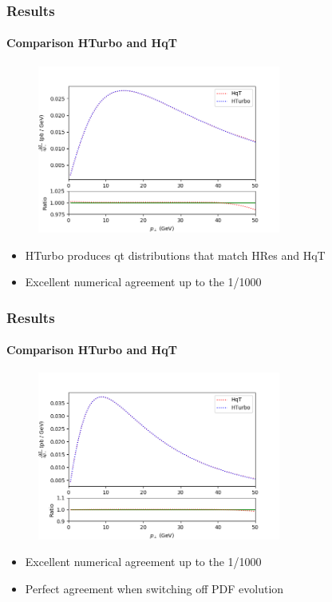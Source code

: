 \documentclass[aspectratio=43]{beamer}
\begin{document}
\begin{frame}
	
	\frametitle{Results}
	\framesubtitle{Comparison HTurbo and HqT}
	
	\begin{figure}
		\includegraphics[width = 8cm]{plots/hturbo_LL.png}
	\end{figure}
	
	\begin{itemize}
		\item HTurbo produces qt distributions that match HRes and HqT
		\item Excellent numerical agreement up to the 1/1000
	\end{itemize}

\end{frame}

\begin{frame}

	\frametitle{Results}
	\framesubtitle{Comparison HTurbo and HqT}
	
	\begin{figure}
		\includegraphics[width = 8cm]{plots/hturbo_NLL_noevol.png}
	\end{figure}
	
	\begin{itemize}
		\item Excellent numerical agreement up to the 1/1000
		\item Perfect agreement when switching off PDF evolution
	\end{itemize}

\end{frame}
\end{document}
